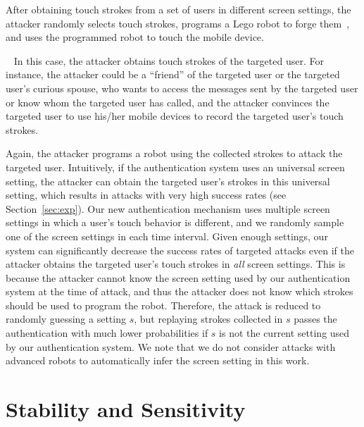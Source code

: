 \documentclass{sig-alternate-05-2015}
\newcommand{\myparatight}[1]{\smallskip\noindent{\bf {#1}:}~}
\begin{document}
After obtaining touch strokes from a set of users in different screen settings,
the attacker randomly selects touch strokes, programs a Lego robot 
to forge them~\cite{attack-CCS13}, and uses the programmed robot to 
touch the mobile device.
 

\myparatight{Targeted attacks} In this case, the attacker obtains touch strokes
of the targeted user. For instance, the attacker could be  a ``friend'' of the
targeted user or the targeted user's curious spouse, who wants to access the
messages sent by the targeted user or know whom the targeted user has called,
and the attacker   convinces the targeted user to use his/her mobile devices to
record the targeted user's  touch strokes. 

Again, the attacker programs a  robot using the collected strokes to attack the targeted user.
Intuitively, if the authentication system uses an universal screen setting, the attacker 
can obtain the targeted user's strokes in this universal setting, which results in attacks 
with very high success rates (see Section~\ref{sec:exp}). Our new authentication mechanism uses multiple screen settings 
in which a user's touch behavior is different, and we randomly sample one of the screen settings 
in each time interval. 
Given enough settings, our system can significantly decrease the success rates of targeted attacks even if the attacker 
obtains the targeted user's  touch strokes 
in \emph{all} screen settings. This is because the attacker cannot know the screen setting used by our
 authentication system at the time of attack, and thus the attacker does not know which strokes should be used to
program the robot. Therefore, the attack is reduced to randomly guessing a setting $s$, but replaying strokes collected in $s$  
 passes the authentication with much lower probabilities if $s$ is not the current setting used by
 our authentication system. 
 We note that we do not consider attacks with advanced robots to automatically infer the screen setting in this work. 














\section{Stability and Sensitivity}
\end{document}
